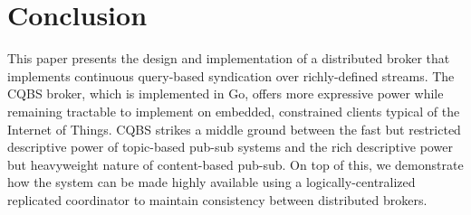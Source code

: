 \section{Conclusion}

This paper presents the design and implementation of a distributed broker that implements continuous query-based syndication over richly-defined streams.
The CQBS broker, which is implemented in Go, offers more expressive power while remaining tractable to implement on embedded, constrained clients typical of the Internet of Things.
CQBS strikes a middle ground between the fast but restricted descriptive power of topic-based pub-sub systems and the rich descriptive power but heavyweight nature of content-based pub-sub.
On top of this, we demonstrate how the system can be made highly available using a logically-centralized replicated coordinator to maintain consistency between distributed brokers.
